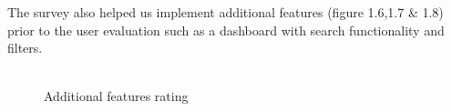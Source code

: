 \documentclass{report}
\begin{document}
\noindent{}The survey also helped us implement additional features (figure
1.6,1.7 \& 1.8) prior to the user evaluation such as a dashboard with search functionality and filters.\\ \\

\begin{figure}
    \centering
    \begin{minipage}{0.95\textwidth}
        \centering
        \caption{Additional features rating}
        \label{fig:plot6}
    \end{minipage}

    \vspace{0.5cm} %


\end{figure}
\end{document}
